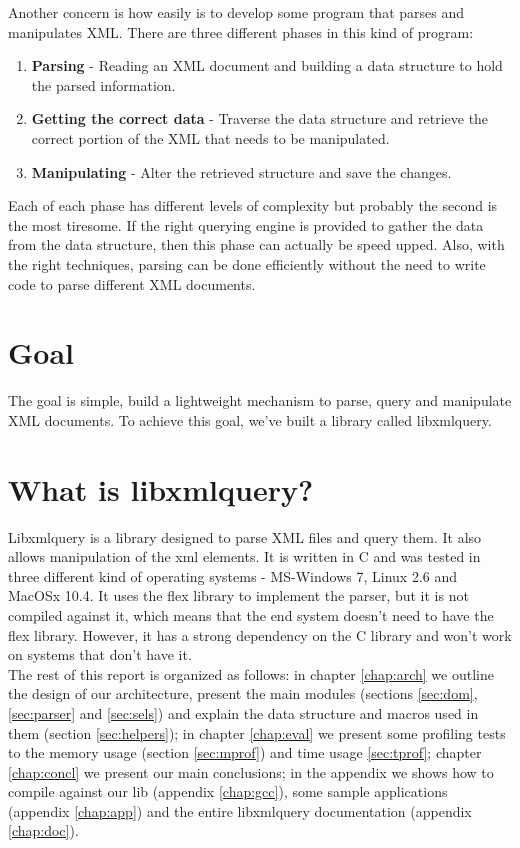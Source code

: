 \documentclass[a4paper]{report}
\begin{document}
	Another concern is how easily is to develop some program that parses and manipulates XML. There are three different phases in this kind of program:
	
	\begin{enumerate}
		\item \textbf{Parsing} - Reading an XML document and building a data structure to hold the parsed information.
		\item \textbf{Getting the correct data} - Traverse the data structure and retrieve the correct portion of the XML that needs to be manipulated.
		\item \textbf{Manipulating} - Alter the retrieved structure and save the changes.
	\end{enumerate}
	
	Each of each phase has different levels of complexity but probably the second is the most tiresome. If the right querying engine is provided to gather the data from the data structure, then this phase can actually be 
	speed upped. Also, with the right techniques, parsing can be done efficiently without the need to write code to parse different XML documents.
	
\section{Goal}
	The goal is simple, build a lightweight mechanism to parse, query and manipulate XML documents. To achieve this goal, we've built a library called libxmlquery.
	
\section{What is libxmlquery?}
	Libxmlquery is a library designed to parse XML files and query them. It also allows manipulation of the xml elements. It is written in C and was tested in three different kind of operating systems - MS-Windows 7, Linux 2.6 
	and MacOSx 10.4. It uses the flex library to implement the parser, but it is not compiled against it, which means that the end system doesn't need to have the flex library. However, it has a strong dependency on the C library
	and won't work on systems that don't have it.\\
	
	
	The rest of this report is organized as follows: in chapter \ref{chap:arch} we outline the design of our architecture, present the main modules (sections \ref{sec:dom}, \ref{sec:parser} and \ref{sec:sels}) and explain the data 
	structure and macros used in them (section \ref{sec:helpers}); in chapter \ref{chap:eval} we present some profiling tests to the memory usage (section \ref{sec:mprof}) and time usage \ref{sec:tprof}; chapter 
	\ref{chap:concl} we present our main conclusions; in the appendix we shows how to compile against our lib (appendix \ref{chap:gcc}), some sample applications (appendix \ref{chap:app}) and the entire libxmlquery 
	documentation (appendix \ref{chap:doc}).
\end{document}
